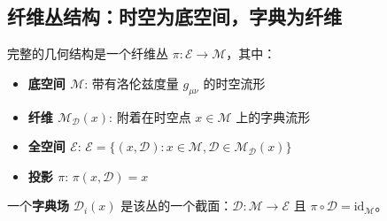 \documentclass[11pt,a4paper]{article}
\begin{document}
	\subsection{纤维丛结构：时空为底空间，字典为纤维}
	完整的几何结构是一个纤维丛 $\pi: \mathcal{E} \to \mathcal{M}$，其中：
	\begin{itemize}
		\item \textbf{底空间 $\mathcal{M}$}: 带有洛伦兹度量 $g_{\mu\nu}$ 的时空流形
		\item \textbf{纤维 $\mathcal{M}_{\mathcal{D}}(x)$}: 附着在时空点 $x \in \mathcal{M}$ 上的字典流形
		\item \textbf{全空间 $\mathcal{E}$}: $\mathcal{E} = \{(x, \mathcal{D}) : x \in \mathcal{M}, \mathcal{D} \in \mathcal{M}_{\mathcal{D}}(x)\}$
		\item \textbf{投影 $\pi$}: $\pi(x, \mathcal{D}) = x$
	\end{itemize}
	
	一个\textbf{字典场} $\mathcal{D}_i(x)$ 是该丛的一个截面：$\mathcal{D}: \mathcal{M} \to \mathcal{E}$ 且 $\pi \circ \mathcal{D} = \text{id}_{\mathcal{M}}$。
	
\end{document}
